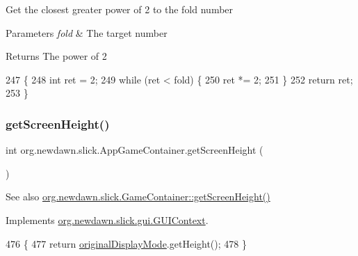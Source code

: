 Get the closest greater power of 2 to the fold number


\begin{DoxyParams}{Parameters}
{\em fold} & The target number \\
\hline
\end{DoxyParams}
\begin{DoxyReturn}{Returns}
The power of 2 
\end{DoxyReturn}

\begin{DoxyCode}
247                                    \{
248         \textcolor{keywordtype}{int} ret = 2;
249         \textcolor{keywordflow}{while} (ret < fold) \{
250             ret *= 2;
251         \}
252         \textcolor{keywordflow}{return} ret;
253     \}
\end{DoxyCode}
\mbox{\label{classorg_1_1newdawn_1_1slick_1_1_app_game_container_add722e9c1f0175f77e41cea0d65c8e90}} 
\subsubsection{\texorpdfstring{get\+Screen\+Height()}{getScreenHeight()}}
{\footnotesize\ttfamily int org.\+newdawn.\+slick.\+App\+Game\+Container.\+get\+Screen\+Height (\begin{DoxyParamCaption}{ }\end{DoxyParamCaption})\hspace{0.3cm}{\ttfamily [inline]}}

\begin{DoxySeeAlso}{See also}
\mbox{\hyperlink{classorg_1_1newdawn_1_1slick_1_1_game_container_afdb008e76bcbc6de23e783670c044f28}{org.\+newdawn.\+slick.\+Game\+Container\+::get\+Screen\+Height()}} 
\end{DoxySeeAlso}


Implements \mbox{\hyperlink{interfaceorg_1_1newdawn_1_1slick_1_1gui_1_1_g_u_i_context_ad7b27d047f72ef86c1ec448492a16d6a}{org.\+newdawn.\+slick.\+gui.\+G\+U\+I\+Context}}.


\begin{DoxyCode}
476                                  \{
477         \textcolor{keywordflow}{return} \mbox{\hyperlink{classorg_1_1newdawn_1_1slick_1_1_app_game_container_a3c00ffa43a8e972598efe7bf27a577ba}{originalDisplayMode}}.getHeight();
478     \}
\end{DoxyCode}
\mbox{\label{classorg_1_1newdawn_1_1slick_1_1_app_game_container_a48293caa27148b1a4dc0b77a047f89f3}} 

